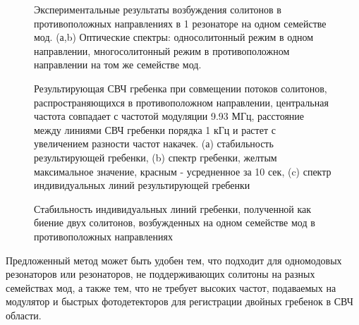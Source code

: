 \begin{figure}[ht]
\begin{minipage}[ht]{1\linewidth}
\end{minipage}
\caption{Экспериментальные результаты возбуждения солитонов в противоположных направлениях в 1 резонаторе на одном семействе мод. (а,b) Оптические спектры: односолитонный режим в одном направлении, многосолитонный режим в противоположном направлении на том же семействе мод.}
\label{cp_one_family}
\end{figure}

\begin{figure}[ht]
\begin{minipage}[ht]{1\linewidth}
\end{minipage}
\caption{Результирующая СВЧ гребенка при совмещении потоков солитонов, распространяющихся в противоположном направлении, центральная частота совпадает с частотой модуляции 9.93 МГц, расстояние между линиями СВЧ гребенки порядка 1 кГц и растет с увеличением разности частот накачек. (а) стабильность результирующей гребенки, (b) спектр гребенки, желтым максимальное значение, красным - усредненное за 10 сек, (c) спектр индивидуальных линий результирующей гребенки}
\label{cp_one_family_dual_comb}
\end{figure}

\begin{figure}[ht]
\begin{minipage}[ht]{1\linewidth}
\end{minipage}
\caption{Стабильность индивидуальных линий гребенки, полученной как биение двух солитонов, возбужденных на одном семействе мод в противоположных направлениях}
\label{cp_one_family_stability}
\end{figure}

Предложенный метод может быть удобен тем, что подходит для одномодовых резонаторов или резонаторов, не поддерживающих солитоны на разных семействах мод, а также тем, что не требует высоких частот, подаваемых на модулятор и быстрых фотодетекторов для регистрации двойных гребенок в СВЧ области.

